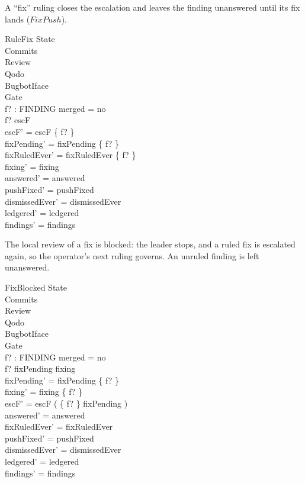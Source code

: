 \documentclass{article}
\begin{document}
A ``fix'' ruling closes the escalation and leaves the finding unanswered until
its fix lands ($FixPush$).

\begin{schema}{RuleFix}
  \Delta State \\
  \Xi Commits \\
  \Xi Review \\
  \Xi Qodo \\
  \Xi BugbotIface \\
  \Xi Gate \\
  f? : FINDING
\where
  merged = no \\
  f? \in escF \\
  escF' = escF \setminus \{ f? \} \\
  fixPending' = fixPending \cup \{ f? \} \\
  fixRuledEver' = fixRuledEver \cup \{ f? \} \\
  fixing' = fixing \\
  answered' = answered \\
  pushFixed' = pushFixed \\
  dismissedEver' = dismissedEver \\
  ledgered' = ledgered \\
  findings' = findings
\end{schema}

The local review of a fix is blocked: the leader stops, and a ruled fix is
escalated again, so the operator's next ruling governs. An unruled finding is
left unanswered.

\begin{schema}{FixBlocked}
  \Delta State \\
  \Xi Commits \\
  \Xi Review \\
  \Xi Qodo \\
  \Xi BugbotIface \\
  \Xi Gate \\
  f? : FINDING
\where
  merged = no \\
  f? \in fixPending \cup fixing \\
  fixPending' = fixPending \setminus \{ f? \} \\
  fixing' = fixing \setminus \{ f? \} \\
  escF' = escF \cup ( \{ f? \} \cap fixPending ) \\
  answered' = answered \\
  fixRuledEver' = fixRuledEver \\
  pushFixed' = pushFixed \\
  dismissedEver' = dismissedEver \\
  ledgered' = ledgered \\
  findings' = findings
\end{schema}
\end{document}

